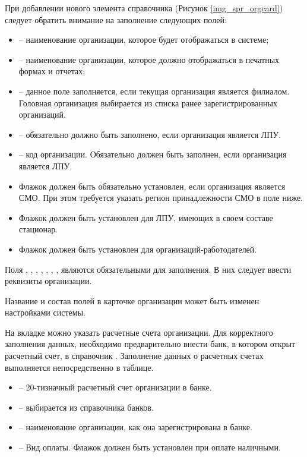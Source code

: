 При добавлении нового элемента справочника (Рисунок \ref{img_spr_orgcard}) следует обратить внимание на заполнение следующих полей:
\begin{itemize}
 \item {} – наименование организации, которое будет отображаться в системе;
 \item {} – наименование организации, которое должно отображаться в печатных формах и отчетах;
 \item {} – данное поле заполняется, если текущая организация является филиалом. Головная организация выбирается из списка ранее зарегистрированных организаций.
 \item {} – обязательно должно быть заполнено, если организация является ЛПУ.
 \item {} – код организации. Обязательно должен быть заполнен, если организация является ЛПУ.
 \item Флажок  должен быть обязательно установлен, если организация является СМО. При этом требуется указать регион принадлежности СМО в поле ниже.
 \item Флажок  должен быть установлен для ЛПУ, имеющих в своем составе стационар.
 \item Флажок  должен быть установлен для организаций-работодателей.
\end{itemize}

Поля , , , , , , ,  являются обязательными для заполнения. В них следует ввести реквизиты организации.

\begin{prim}
Название и состав полей в карточке организации может быть изменен настройками системы.
\end{prim}

На вкладке  можно указать расчетные счета организации. Для корректного заполнения данных, необходимо предварительно внести банк, в котором открыт расчетный счет, в справочник . Заполнение данных о расчетных счетах выполняется непосредственно в таблице.
\begin{itemize}
 \item {} – 20-тизначный расчетный счет организации в банке.
 \item {} – выбирается из справочника банков.
 \item {} – наименование организации, как она зарегистрирована в банке.
 \item {} – Вид оплаты. Флажок должен быть установлен при оплате наличными.
\end{itemize}

